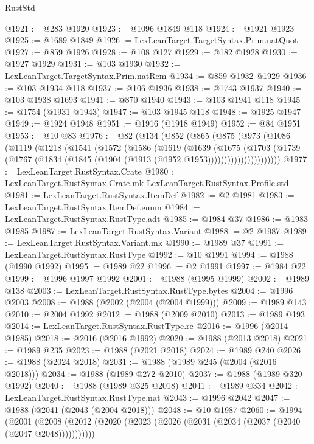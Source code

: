 \begin{lexlean}{RustStd}
\begin{coremodule}
@1921 := @283 @1920
@1923 := @1096 @1849 @118
@1924 := @1921 @1923
@1925 := @1689 @1849
@1926 := LexLeanTarget.TargetSyntax.Prim.natQuot
@1927 := @859 @1926
@1928 := @108 @127
@1929 := @182 @1928
@1930 := @1927 @1929
@1931 := @103 @1930
@1932 := LexLeanTarget.TargetSyntax.Prim.natRem
@1934 := @859 @1932 @1929
@1936 := @103 @1934 @118
@1937 := @106 @1936
@1938 := @1743 @1937
@1940 := @103 @1938 @1693
@1941 := @870 @1940
@1943 := @103 @1941 @118
@1945 := @1754 (@1931 @1943)
@1947 := @103 @1945 @118
@1948 := @1925 @1947
@1949 := @1924 @1948
@1951 := @1916 (@1918 @1949)
@1952 := @84 @1951
@1953 := @10 @83
@1976 := @82
    (@134
      (@852
        (@865
          (@875
            (@973
              (@1086
                (@1119
                  (@1218
                    (@1541
                      (@1572
                        (@1586
                          (@1619
                            (@1639
                              (@1675
                                (@1703
                                  (@1739
                                    (@1767
                                      (@1834 (@1845 (@1904 (@1913 (@1952 @1953))))))))))))))))))))))
@1977 := LexLeanTarget.RustSyntax.Crate
@1980 := LexLeanTarget.RustSyntax.Crate.mk LexLeanTarget.RustSyntax.Profile.std
@1981 := LexLeanTarget.RustSyntax.ItemDef
@1982 := @2 @1981
@1983 := LexLeanTarget.RustSyntax.ItemDef.enum
@1984 := LexLeanTarget.RustSyntax.RustType.adt
@1985 := @1984 @37
@1986 := @1983 @1985
@1987 := LexLeanTarget.RustSyntax.Variant
@1988 := @2 @1987
@1989 := LexLeanTarget.RustSyntax.Variant.mk
@1990 := @1989 @37
@1991 := LexLeanTarget.RustSyntax.RustType
@1992 := @10 @1991
@1994 := @1988 (@1990 @1992)
@1995 := @1989 @22
@1996 := @2 @1991
@1997 := @1984 @22
@1999 := @1996 @1997 @1992
@2001 := @1988 (@1995 @1999)
@2002 := @1989 @138
@2003 := LexLeanTarget.RustSyntax.RustType.bytes
@2004 := @1996 @2003
@2008 := @1988 (@2002 (@2004 (@2004 @1999)))
@2009 := @1989 @143
@2010 := @2004 @1992
@2012 := @1988 (@2009 @2010)
@2013 := @1989 @193
@2014 := LexLeanTarget.RustSyntax.RustType.rc
@2016 := @1996 (@2014 @1985)
@2018 := @2016 (@2016 @1992)
@2020 := @1988 (@2013 @2018)
@2021 := @1989 @235
@2023 := @1988 (@2021 @2018)
@2024 := @1989 @240
@2026 := @1988 (@2024 @2018)
@2031 := @1988 (@1989 @245 (@2004 (@2016 @2018)))
@2034 := @1988 (@1989 @272 @2010)
@2037 := @1988 (@1989 @320 @1992)
@2040 := @1988 (@1989 @325 @2018)
@2041 := @1989 @334
@2042 := LexLeanTarget.RustSyntax.RustType.nat
@2043 := @1996 @2042
@2047 := @1988 (@2041 (@2043 (@2004 @2018)))
@2048 := @10 @1987
@2060 := @1994
    (@2001 (@2008 (@2012 (@2020 (@2023 (@2026 (@2031 (@2034 (@2037 (@2040 (@2047 @2048)))))))))))

\end{coremodule}
\end{lexlean}

